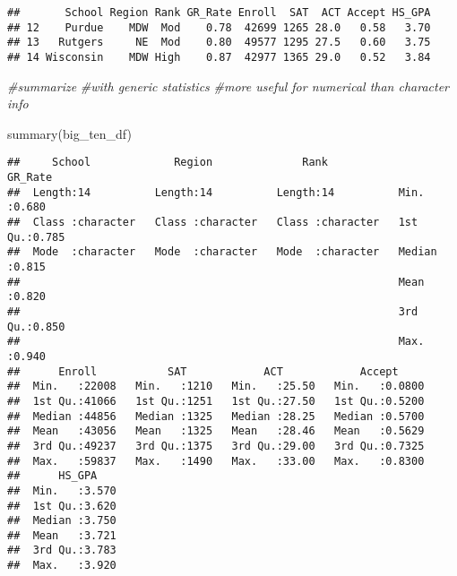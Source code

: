 \documentclass[
]{article}
\newenvironment{Shaded}{\begin{snugshade}}{\end{snugshade}}
\newcommand{\CommentTok}[1]{\textcolor[rgb]{0.56,0.35,0.01}{\textit{#1}}}
\newcommand{\FunctionTok}[1]{\textcolor[rgb]{0.00,0.00,0.00}{#1}}
\newcommand{\NormalTok}[1]{#1}
\begin{document}
\begin{verbatim}
##       School Region Rank GR_Rate Enroll  SAT  ACT Accept HS_GPA
## 12    Purdue    MDW  Mod    0.78  42699 1265 28.0   0.58   3.70
## 13   Rutgers     NE  Mod    0.80  49577 1295 27.5   0.60   3.75
## 14 Wisconsin    MDW High    0.87  42977 1365 29.0   0.52   3.84
\end{verbatim}

\begin{Shaded}
\begin{Highlighting}[]
\CommentTok{\#summarize }
\CommentTok{\#with generic statistics}
\CommentTok{\#more useful for numerical than character info }

\FunctionTok{summary}\NormalTok{(big\_ten\_df)}
\end{Highlighting}
\end{Shaded}

\begin{verbatim}
##     School             Region              Rank              GR_Rate     
##  Length:14          Length:14          Length:14          Min.   :0.680  
##  Class :character   Class :character   Class :character   1st Qu.:0.785  
##  Mode  :character   Mode  :character   Mode  :character   Median :0.815  
##                                                           Mean   :0.820  
##                                                           3rd Qu.:0.850  
##                                                           Max.   :0.940  
##      Enroll           SAT            ACT            Accept      
##  Min.   :22008   Min.   :1210   Min.   :25.50   Min.   :0.0800  
##  1st Qu.:41066   1st Qu.:1251   1st Qu.:27.50   1st Qu.:0.5200  
##  Median :44856   Median :1325   Median :28.25   Median :0.5700  
##  Mean   :43056   Mean   :1325   Mean   :28.46   Mean   :0.5629  
##  3rd Qu.:49237   3rd Qu.:1375   3rd Qu.:29.00   3rd Qu.:0.7325  
##  Max.   :59837   Max.   :1490   Max.   :33.00   Max.   :0.8300  
##      HS_GPA     
##  Min.   :3.570  
##  1st Qu.:3.620  
##  Median :3.750  
##  Mean   :3.721  
##  3rd Qu.:3.783  
##  Max.   :3.920
\end{verbatim}
\end{document}
